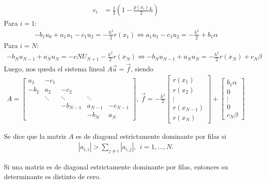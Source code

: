 \begin{ejemplo}
\begin{align*}
    c_i &= \frac{1}{2}\left(1 - \frac{p(x_i)}{2}h \right)
\end{align*}
Para $i = 1$:
\begin{align*}
    -b_1u_0 + a_1u_1 - c_1u_2 = -\frac{h^2}{2}r(x_1) \Longleftrightarrow a_1u_1 - c_1u_2 = -\frac{h^2}{2} + b_1\alpha
\end{align*}
Para $i = N$:
\begin{align*}
    -b_Nu_{N-1} + a_Nu_N = -cNU_{N+1}-\frac{h^2}{2}r(x_N) \Longleftrightarrow -b_Nu_{N-1} + a_Nu_N = -\frac{h^2}{2}r(x_N) + c_N\beta
\end{align*}
Luego, nos queda el sistema lineal $A \overrightarrow{u} = \overrightarrow{f}$, siendo
\begin{align*}
    A = \begin{bmatrix}
a_1 & -c_1 &  &  & \\
-b_2 & a_2 & -c_2 &  & \\
 & \ddots & \ddots & \ddots & \\
 &  & -b_{N-1} & a_{N-1} & -c_{N-1} \\
 &  &  & -b_N & a_N
\end{bmatrix}, \ \overrightarrow{f} = -\frac{h^2}{2} \begin{bmatrix}
r(x_1)\\
r(x_2) \\
\vdots\\
r(x_{N-1}) \\
r(x_N)
\end{bmatrix} + \begin{bmatrix}
b_1 \alpha\\
0 \\
\vdots\\
0 \\
c_N\beta
\end{bmatrix}
\end{align*}
\end{ejemplo}

\begin{defi}
Se dice que la matriz $A$ es de diagonal estrictamente dominante por filas si
\begin{align*}
    |a_{i,i}| > \sum_{j \not = i} |a_{i,j}|, \ \ i = 1,\ldots,N.
\end{align*}
\end{defi}

\begin{teo}
Si una matriz es de diagonal estrictamente dominante por filas, entonces su determinante es distinto de cero.
\end{teo}


